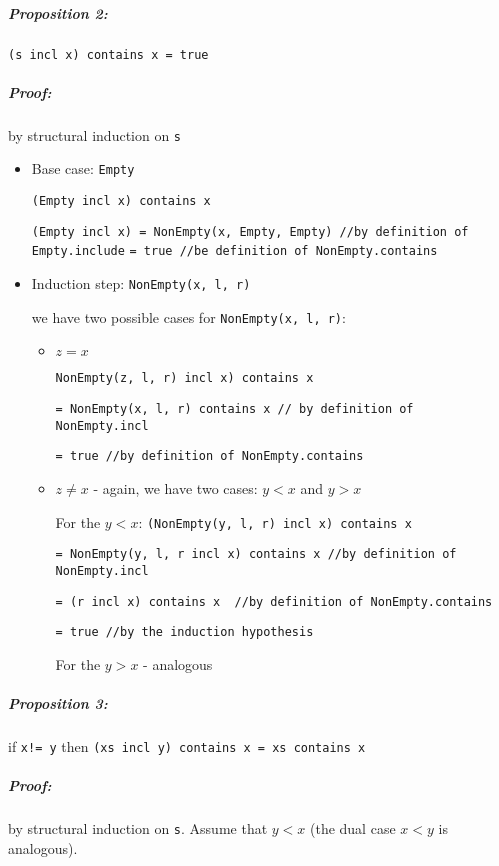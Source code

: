 \documentclass{scrartcl}
\begin{document}
\subparagraph{Proposition 2:} \lstinline|(s incl x) contains x = true|
\subparagraph{Proof:} by structural induction on \lstinline|s|

\begin{itemize}
\item Base case: \lstinline|Empty|

\lstinline|(Empty incl x) contains x|

\lstinline|(Empty incl x) = NonEmpty(x, Empty, Empty) //by definition of Empty.include|
\lstinline|= true //be definition of NonEmpty.contains|

\item Induction step: \lstinline|NonEmpty(x, l, r)|

we have two possible cases for \lstinline|NonEmpty(x, l, r)|:
\begin{itemize}
\item $z = x$

  \lstinline|NonEmpty(z, l, r) incl x) contains x|

  \lstinline|= NonEmpty(x, l, r) contains x // by definition of NonEmpty.incl|

  \lstinline|= true //by definition of NonEmpty.contains|

\item $z \neq x$ - again, we have two cases: $y < x$ and $y > x$

  For the $y < x$: \lstinline|(NonEmpty(y, l, r) incl x) contains x|

  \lstinline|= NonEmpty(y, l, r incl x) contains x //by definition of NonEmpty.incl|

\lstinline|= (r incl x) contains x  //by definition of NonEmpty.contains|

\lstinline|= true //by the induction hypothesis|

For the $y > x$ - analogous
\end{itemize}
\end{itemize}

\subparagraph{Proposition 3:} if \lstinline|x!= y| then 
\lstinline|(xs incl y) contains x = xs contains x|
\subparagraph{Proof:} by structural induction on \lstinline|s|. Assume that $y <
x$ (the dual case $x < y$ is analogous).
\end{document}
